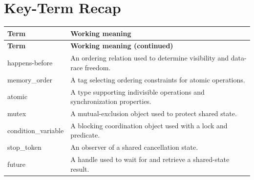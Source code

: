 \documentclass[11pt,letterpaper]{article}
\begin{document}
\section{Key-Term Recap}
\begin{longtable}{@{}>{\RaggedRight\arraybackslash}p{}>{\RaggedRight\arraybackslash}p{}@{}}\toprule\textbf{Term} & \textbf{Working meaning}\\\midrule\endfirsthead\toprule\textbf{Term} & \textbf{Working meaning (continued)}\\\midrule\endhead\bottomrule\endfoot
happens-before & An ordering relation used to determine visibility and data-race freedom.\\
memory\_\allowbreak{}order & A tag selecting ordering constraints for atomic operations.\\
atomic & A type supporting indivisible operations and synchronization properties.\\
mutex & A mutual-exclusion object used to protect shared state.\\
condition\_\allowbreak{}variable & A blocking coordination object used with a lock and predicate.\\
stop\_\allowbreak{}token & An observer of a shared cancellation state.\\
future & A handle used to wait for and retrieve a shared-state result.\\
\end{longtable}
\end{document}
